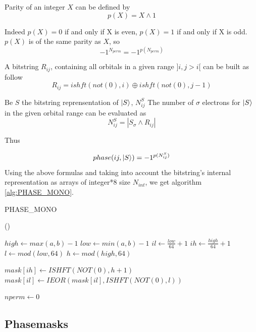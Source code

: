 Parity of an integer $X$ can be defined by $$p(X)=X \wedge 1$$
        
Indeed $p(X)=0$ if and only if X is even, $p(X)=1$ if and only if X is odd. $p(X)$ is of the same parity as $X$, so 
$$-1^{N_{perm}} = -1^{p(N_{perm})}$$
        
        

A bitstring $R_{ij}$, containing all orbitals in a given range $]i, j>i[$ can be built as follow
$$R_{ij}=ishft(not(0),i) \oplus ishft(not(0),j-1)$$


Be $S$ the bitstring reprensentation of $\ket S$, $N^{S}_{ij}$ The number of $\sigma$ electrons for $\ket S$ in the given orbital range can be evaluated as
$$N^{S}_{ij} = |S_\sigma \wedge R_{ij}|$$

Thus 

$$phase(ij, \ket S) = -1^{p(N^S_{ij})}$$
Using the above formulas and taking into account the bitstring's internal representation as arrays of integer*8 size $N_{int}$, we get algorithm \ref{alg:PHASE_MONO}.   


\begin{algorithm}
	\caption{PHASE\_MONO}	
	\label{alg:PHASE_MONO}
	
	\Fn(){}{
		$high \gets max(a,b)-1$ \;
		$low \gets min(a,b)-1$ \;
		$il \gets \frac{low}{64} + 1$ \;
		$ih \gets \frac{high}{64} + 1$ \;
		$l \gets mod(low, 64)$ \;
		$h \gets mod(high, 64)$ \; 

		
		$mask[ih] \gets ISHFT(NOT(0), h+1)$ \;
		$mask[il] \gets IEOR(mask[il], ISHFT(NOT(0), l))$ \;
		
		
		$nperm \gets 0$ \;
		}
\end{algorithm}
        

\subsection{Phasemasks}


